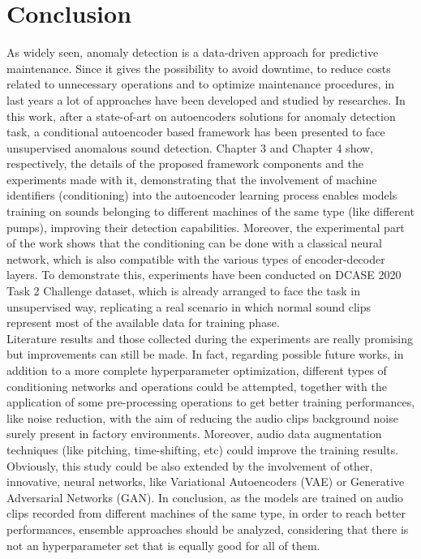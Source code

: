 \chapter{Conclusion}
As widely seen, anomaly detection is a data-driven approach for predictive maintenance. Since it gives the possibility to avoid downtime, to reduce costs related to unnecessary operations and to optimize maintenance procedures, in last years a lot of approaches have been developed and studied by researches. In this work, after a state-of-art on autoencoders solutions for anomaly detection task, a conditional autoencoder based framework has been presented to face unsupervised anomalous sound detection. Chapter 3 and Chapter 4 show, respectively, the details of the proposed framework components and the experiments made with it, demonstrating that the involvement of machine identifiers (conditioning) into the autoencoder learning process enables models training on sounds belonging to different machines of the same type (like different pumps), improving their detection capabilities. Moreover, the experimental part of the work shows that the conditioning can be done with a classical neural network, which is also compatible with the various types of encoder-decoder layers. To demonstrate this, experiments have been conducted on DCASE 2020 Task 2 Challenge dataset, which is already arranged to face the task in unsupervised way, replicating a real scenario in which normal sound clips represent most of the available data for training phase.\\
Literature results and those collected during the experiments are really promising but improvements can still be made. In fact, regarding possible future works, in addition to a more complete hyperparameter optimization, different types of conditioning networks and operations could be attempted, together with the application of some pre-processing operations to get better training performances, like noise reduction, with the aim of reducing the audio clips background noise surely present in factory environments. Moreover, audio data augmentation techniques (like pitching, time-shifting, etc) could improve the training results. Obviously, this study could be also extended by the involvement of other, innovative, neural networks, like Variational Autoencoders (VAE) or Generative Adversarial Networks (GAN). In conclusion, as the models are trained on audio clips recorded from different machines of the same type, in order to reach better performances, ensemble approaches should be analyzed, considering that there is not an hyperparameter set that is equally good for all of them.